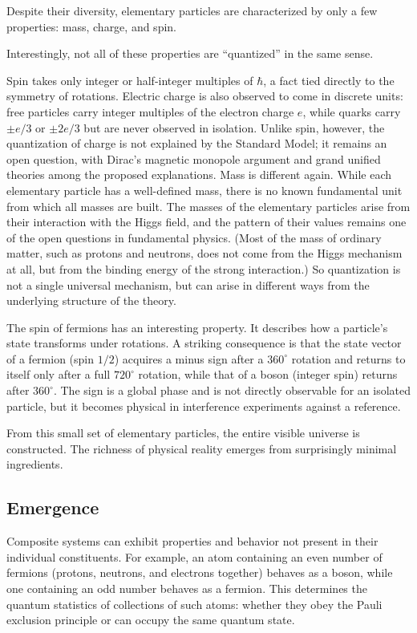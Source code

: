Despite their diversity, elementary particles are characterized by only a few properties: mass, charge, and spin.

Interestingly, not all of these properties are ``quantized'' in the same sense.

Spin takes only integer or half-integer multiples of $\hbar$, a fact tied directly to the symmetry of rotations. Electric charge is also observed to come in discrete units: free particles carry integer multiples of the electron charge $e$, while quarks carry $\pm e/3$ or $\pm 2e/3$ but are never observed in isolation. Unlike spin, however, the quantization of charge is not explained by the Standard Model; it remains an open question, with Dirac's magnetic monopole argument and grand unified theories among the proposed explanations. Mass is different again. While each elementary particle has a well-defined mass, there is no known fundamental unit from which all masses are built. The masses of the elementary particles arise from their interaction with the Higgs field, and the pattern of their values remains one of the open questions in fundamental physics. (Most of the mass of ordinary matter, such as protons and neutrons, does not come from the Higgs mechanism at all, but from the binding energy of the strong interaction.) So quantization is not a single universal mechanism, but can arise in different ways from the underlying structure of the theory.

The spin of fermions has an interesting property. It describes how a particle's state transforms under rotations. A striking consequence is that the state vector of a fermion
(spin $1/2$) acquires a minus sign after a $360^\circ$ rotation and returns to itself only after a full $720^\circ$ rotation, while that of a boson (integer spin) returns after $360^\circ$. The sign is a global phase and is not directly observable for an isolated particle, but it becomes physical in interference experiments against a reference.

From this small set of elementary particles, the entire visible universe is constructed. The richness of physical reality emerges from surprisingly minimal ingredients. 

\subsection*{Emergence}

Composite systems can exhibit properties and behavior not present in their individual constituents. 
For example, an atom containing an even number of fermions (protons, neutrons, and electrons together) behaves as a boson, while one containing an odd number behaves as a fermion. 
This determines the quantum statistics of collections of such atoms: whether they obey the Pauli exclusion
principle or can occupy the same quantum state.

